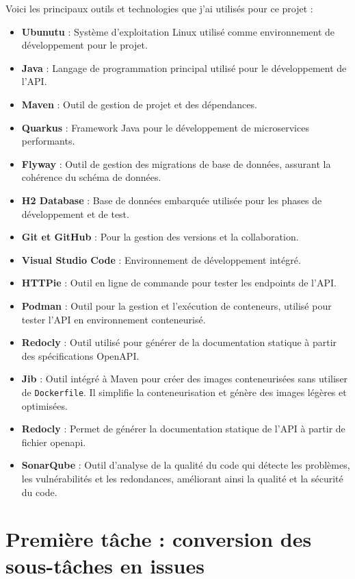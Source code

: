 \documentclass{article}
\begin{document}
	Voici les principaux outils et technologies que j’ai utilisés pour ce projet :
\begin{itemize}
	\item \textbf{Ubunutu} : Système d'exploitation Linux utilisé comme environnement de développement pour le projet.
	\item \textbf{Java} : Langage de programmation principal utilisé pour le développement de l'API.
	\item \textbf{Maven} : Outil de gestion de projet et des dépendances.
	\item \textbf{Quarkus} : Framework Java pour le développement de microservices performants.
	\item \textbf{Flyway} : Outil de gestion des migrations de base de données, assurant la cohérence du schéma de données.
	\item \textbf{H2 Database} : Base de données embarquée utilisée pour les phases de développement et de test.
	\item \textbf{Git et GitHub} : Pour la gestion des versions et la collaboration.
	\item \textbf{Visual Studio Code} : Environnement de développement intégré.
	\item \textbf{HTTPie} : Outil en ligne de commande pour tester les endpoints de l'API.
	\item \textbf{Podman} : Outil pour la gestion et l'exécution de conteneurs, utilisé pour tester l'API en environnement conteneurisé.
	\item \textbf{Redocly} : Outil utilisé pour générer de la documentation statique à partir des spécifications OpenAPI.
	\item \textbf{Jib} : Outil intégré à Maven pour créer des images conteneurisées sans utiliser de \texttt{Dockerfile}. Il simplifie la conteneurisation et génère des images légères et optimisées.
	\item \textbf{Redocly} : Permet de générer la documentation statique de l'API à partir de fichier openapi.
	\item \textbf{SonarQube} : Outil d'analyse de la qualité du code qui détecte les problèmes, les vulnérabilités et les redondances, améliorant ainsi la qualité et la sécurité du code.
\end{itemize}

	
	\section{Première tâche : conversion des sous-tâches en issues}
	
\end{document}
